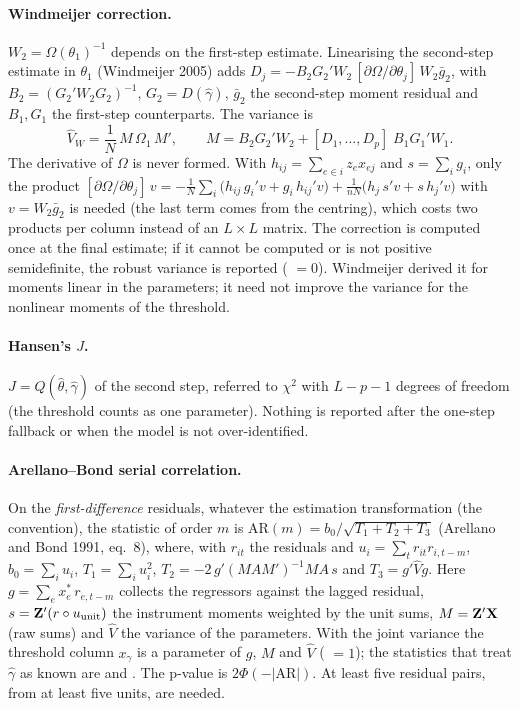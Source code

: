 \documentclass[
  10.5pt,
  a4paper,
]{article}
\begin{document}
\paragraph{Windmeijer correction.} $W_2=\Omega(\theta_1)^{-1}$ depends on the first-step estimate.
Linearising the second-step estimate in $\theta_1$ (Windmeijer 2005) adds
$D_j=-B_2G_2'W_2\,[\partial\Omega/\partial\theta_j]\,W_2\bar g_2$, with $B_2=(G_2'W_2G_2)^{-1}$,
$G_2=D(\hat\gamma)$, $\bar g_2$ the second-step moment residual and $B_1,G_1$ the first-step
counterparts. The variance is
\begin{equation}\label{eq:wind}
\widehat V_W=\frac1N\,M\,\Omega_1\,M',\qquad M=B_2G_2'W_2+[D_1,\dots,D_p]\;B_1G_1'W_1 .
\end{equation}
The derivative of $\Omega$ is never formed. With $h_{ij}=\sum_{e\in i}z_ex_{ej}$ and
$s=\sum_ig_i$, only the product
$[\partial\Omega/\partial\theta_j]\,v=-\frac1N\sum_i\bigl(h_{ij}\,g_i'v+g_i\,h_{ij}'v\bigr)
+\frac{1}{nN}\bigl(h_j\,s'v+s\,h_j'v\bigr)$ with $v=W_2\bar g_2$ is needed (the last term comes from the
centring), which costs two products per column instead of an $L\times L$ matrix. The correction is
computed once at the final estimate; if it cannot be computed or is not positive semidefinite, the
robust variance is reported ( $=0$). Windmeijer derived it for moments linear
in the parameters; it need not improve the variance for the nonlinear moments of the threshold.

\paragraph{Hansen's $J$.} $J=Q(\hat\theta,\hat\gamma)$ of the second step, referred to $\chi^2$ with
$L-p-1$ degrees of freedom (the threshold counts as one parameter). Nothing is reported after the
one-step fallback or when the model is not over-identified.

\paragraph{Arellano--Bond serial correlation.} On the \emph{first-difference} residuals, whatever the
estimation transformation (the  convention), the statistic of order $m$ is
$\mathrm{AR}(m)=b_0/\sqrt{T_1+T_2+T_3}$ (Arellano and Bond 1991, eq.~8), where, with
$r_{it}$ the residuals and $u_i=\sum_t r_{it}r_{i,t-m}$,
$b_0=\sum_iu_i$, $T_1=\sum_iu_i^2$, $T_2=-2\,g'(MAM')^{-1}MA\,s$ and $T_3=g'\widehat V g$. Here
$g=\sum_e x^*_e\,r_{e,t-m}$ collects the regressors against the lagged residual, $s=\mathbf{Z}'(r\circ u_{\text{unit}})$
the instrument moments weighted by the unit sums, $M=\mathbf{Z}'\mathbf{X}$ (raw sums) and $\widehat V$ the variance
of the parameters. With the joint variance the threshold column $x_\gamma$ is a parameter of $g$, $M$ and
$\widehat V$ ( $=1$); the statistics that treat $\hat\gamma$ as known are
 and . The p-value is $2\Phi(-|\mathrm{AR}|)$. At least five
residual pairs, from at least five units, are needed.
\end{document}
